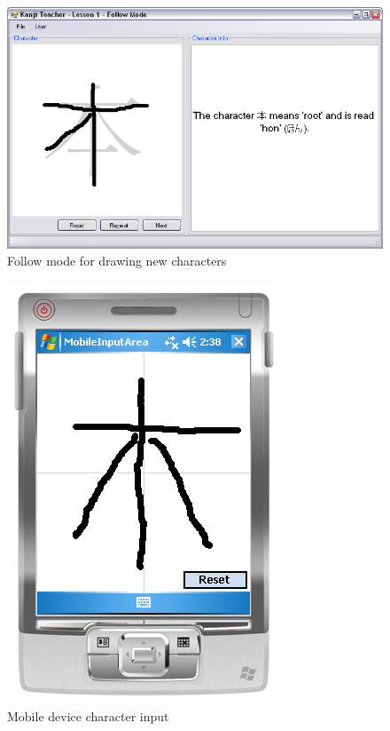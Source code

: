 \begin{figure}[htbp]
\begin{center}
\includegraphics[scale=0.6]{images/ConceptualDesign/followMode.png}
\caption{Follow mode for drawing new characters}
\label{fig:followMode}
\end{center}
\end{figure}


\begin{figure}[htbp]
\begin{center}
\includegraphics[scale=0.6]{images/ConceptualDesign/mobileDeviceInput.png}
\caption{Mobile device character input}
\label{fig:mobileDeviceInput}
\end{center}
\end{figure}

